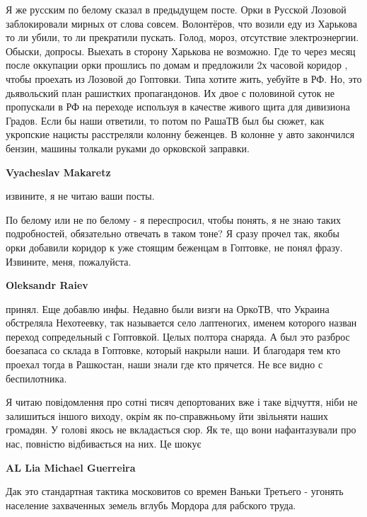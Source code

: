 \begin{itemize}
\begin{itemize}
Я же русским по белому сказал в предыдущем посте. Орки в Русской Лозовой
заблокировали мирных от слова совсем. Волонтёров, что возили еду из Харькова то
ли убили, то ли прекратили пускать. Голод, мороз, отсутствие электроэнергии.
Обыски, допросы. Выехать в сторону Харькова не возможно. Где то через месяц
после оккупации орки прошлись по домам и предложили 2х часовой коридор , чтобы
проехать из Лозовой до Гоптовки. Типа хотите жить, уебуйте в РФ. Но, это
дьявольский план рашистких пропагандонов. Их двое с половиной суток не
пропускали в РФ на переходе используя в качестве живого щита для дивизиона
Градов. Если бы наши ответили, то потом по РашаТВ был бы сюжет, как укропские
нацисты расстреляли колонну беженцев. В колонне у авто закончился бензин,
машины толкали руками до орковской заправки.

\textbf{Vyacheslav Makaretz} 

извините, я не читаю ваши посты.

По белому или не по белому - я переспросил, чтобы понять, я не знаю таких
подробностей, обязательно отвечать в таком тоне? Я сразу прочел так, якобы орки
добавили коридор к уже стоящим беженцам в Гоптовке, не понял фразу. Извините,
меня, пожалуйста.

\textbf{Oleksandr Raiev}

принял. Еще добавлю инфы. Недавно были визги на ОркоТВ, что Украина обстреляла
Нехотеевку, так называется село лаптеногих, именем которого назван переход
сопредельный с Гоптовкой. Целых полтора снаряда. А был это разброс боезапаса со
склада в Гоптовке, который накрыли наши. И благодаря тем кто проехал тогда в
Рашкостан, наши знали где кто прячется. Не все видно с беспилотника.

\end{itemize} %


Я читаю повідомлення про сотні тисяч депортованих вже і таке відчуття, ніби не
залишиться іншого виходу, окрім як по-справжньому йти звільняти наших громадян.
У голові якось не вкладається сюр. Як те, що вони нафантазували про нас,
повністю відбивається на них. Це шокує

\begin{itemize} %
\textbf{AL Lia Michael Guerreira} 

Дак это стандартная тактика московитов со времен Ваньки Третьего - угонять
население захваченных земель вглубь Мордора для рабского труда.


\end{itemize}
\end{itemize}
